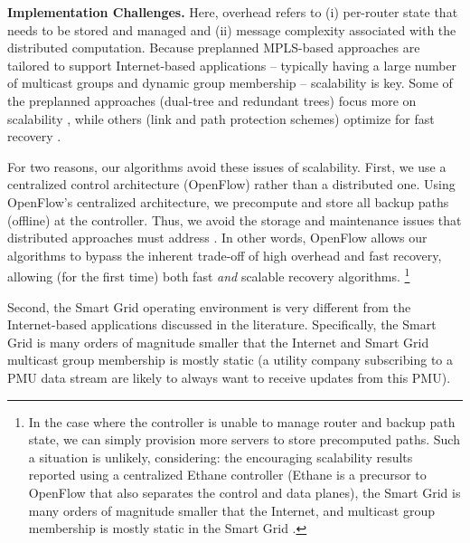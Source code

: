 {\bf Implementation Challenges.}
Here, overhead refers to (i) per-router state that needs to be stored and managed and (ii) message complexity associated with the distributed computation.
Because preplanned MPLS-based approaches are tailored to support Internet-based applications -- typically having a large number of multicast groups and dynamic group membership -- scalability is key.
Some of the preplanned approaches (dual-tree and redundant trees) focus more on scalability \cite{Cui04,Fei01,Medard99}, while others 
(link and path protection schemes) optimize for fast recovery \cite{Pointurier02,Wu97}.  

For two reasons, our algorithms avoid these issues of scalability. First,
we use a centralized control architecture (OpenFlow) rather than a distributed one.
Using OpenFlow's centralized architecture, we precompute and store all backup paths (offline) at the controller.  
Thus, we avoid the storage and maintenance issues that distributed approaches must address  \cite{Cui04,Fei01,Pointurier02,Wu97}.
In other words, OpenFlow allows our algorithms to bypass the inherent trade-off of high overhead and fast recovery, allowing (for the first time) both fast \emph{and} scalable recovery algorithms.
\footnote{In the case where the controller is unable to manage router and backup path state, we can simply provision more servers to store precomputed paths.  
Such a situation is unlikely, considering: the encouraging scalability results reported using a centralized Ethane controller \cite{Ethane07} 
(Ethane is a precursor to OpenFlow that also separates the control and data planes), the Smart Grid is many orders of
magnitude smaller that the Internet, and multicast group membership is mostly static in the Smart Grid \cite{Bakken11}.}

Second, the Smart Grid operating environment is very different from the Internet-based applications discussed in the literature.  Specifically, the Smart Grid is many orders of
magnitude smaller that the Internet and Smart Grid multicast group membership is mostly static \cite{Bakken11} (a utility company subscribing to a PMU data stream are likely to always want to
receive updates from this PMU). 


